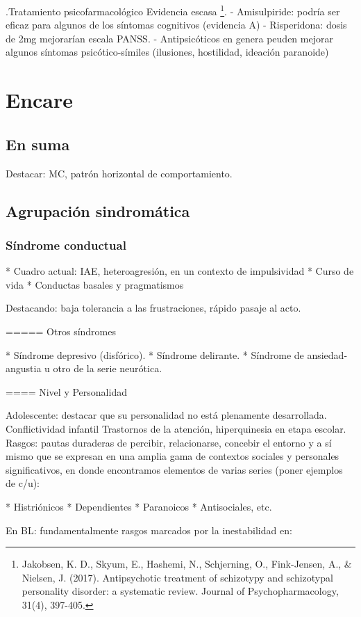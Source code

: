 .Tratamiento psicofarmacológico
Evidencia escasa \footnote{Jakobsen, K. D., Skyum, E., Hashemi, N., Schjerning, O., Fink-Jensen, A., \& Nielsen, J. (2017). Antipsychotic treatment of schizotypy and schizotypal personality disorder: a systematic review. Journal of Psychopharmacology, 31(4), 397-405.}.
- Amisulpiride: podría ser eficaz para algunos de los síntomas cognitivos (evidencia A)
- Risperidona: dosis de 2mg mejorarían escala PANSS.
- Antipsicóticos en genera peuden mejorar algunos síntomas psicótico-símiles (ilusiones, hostilidad, ideación paranoide)
\section*{Encare}
\subsection*{En suma}
Destacar: MC, patrón horizontal de comportamiento.
\subsection*{Agrupación sindromática}
\subsubsection*{Síndrome conductual}

* Cuadro actual: IAE, heteroagresión, en un contexto de impulsividad
* Curso de vida
* Conductas basales y pragmatismos

Destacando: baja tolerancia a las frustraciones, rápido pasaje al acto.

===== Otros síndromes

* Síndrome depresivo (disfórico).
* Síndrome delirante.
* Síndrome de ansiedad-angustia u otro de la serie neurótica.

==== Nivel y Personalidad

Adolescente: destacar que su personalidad no está plenamente desarrollada. Conflictividad infantil Trastornos de la atención, hiperquinesia en etapa escolar. Rasgos: pautas duraderas de percibir, relacionarse, concebir el entorno y a sí mismo que se expresan en una amplia gama de contextos sociales y personales significativos, en donde encontramos elementos de varias series (poner ejemplos de c/u):

* Histriónicos
* Dependientes
* Paranoicos
* Antisociales, etc.

En BL: fundamentalmente rasgos marcados por la inestabilidad en:


